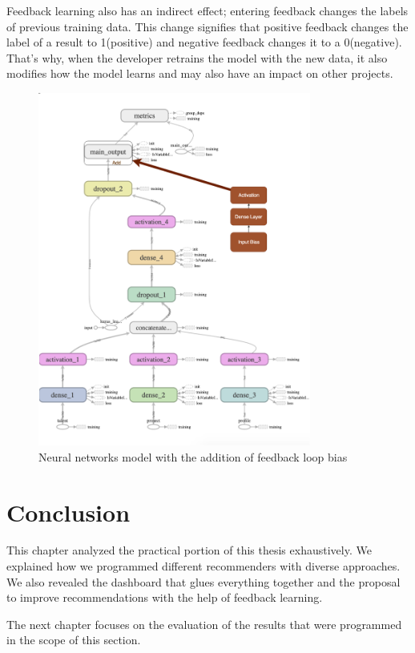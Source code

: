 Feedback learning also has an indirect effect;  entering feedback changes the labels of previous training data. This change signifies that positive feedback changes the label of a result to 1(positive) and negative feedback changes it to a 0(negative). That's why, when the developer retrains the model with the new data, it also modifies how the model learns and may also have an impact on other projects.


 \begin{figure}[!ht]
	\centering
	\includegraphics[width=0.8\textwidth]{figures/TensorBoardFeedback.png}
	\caption{Neural networks model with the addition of feedback loop bias}
	\label{fig:tensorboard-feedback}
\end{figure}



\section{Conclusion}

This chapter analyzed the practical portion of this thesis exhaustively. We explained how we programmed different recommenders with diverse approaches. We also revealed the dashboard that glues everything together and the proposal to improve recommendations with the help of feedback learning. 

The next chapter focuses on the evaluation of the results that were programmed in the scope of this section.

